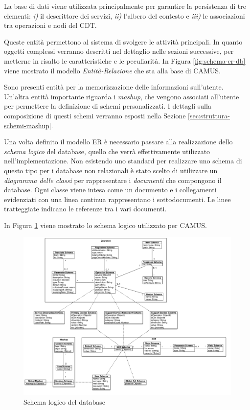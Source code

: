 La base di dati viene utilizzata principalmente per garantire la persistenza di tre elementi: \emph{i)} il descrittore dei servizi, \emph{ii)} l'albero del contesto e \emph{iii)} le associazioni tra operazioni e nodi del CDT.

Queste entità permettono al sistema di svolgere le attività principali. In quanto oggetti complessi verranno descritti nel dettaglio nelle sezioni successive, per metterne in risalto le caratteristiche e le peculiarità. In Figura \ref{fig:schema-er-db} viene mostrato il modello \emph{Entità-Relazione} che sta alla base di CAMUS.

Sono presenti entità per la memorizzazione delle informazioni sull'u\-ten\-te. Un'altra entità importante riguarda i \emph{mashup}, che vengono associati all'utente per permettere la definizione di schemi personalizzati. I dettagli sulla composizione di questi schemi verranno esposti nella Sezione \ref{sec:struttura-schemi-mashup}.

Una volta definito il modello ER è necessario passare alla realizzazione dello \emph{schema logico} del database, quello che verrà effettivamente utilizzato nell'im\-ple\-men\-ta\-zio\-ne. Non esistendo uno standard per realizzare uno schema di questo tipo per i database non relazionali è stato scelto di utilizzare un \emph{diagramma delle classi} per rappresentare i \emph{documenti} che compongono il database. Ogni classe viene intesa come un documento e i collegamenti evidenziati con una linea continua rappresentano i sottodocumenti. Le linee tratteggiate indicano le referenze tra i vari documenti.

In Figura \ref{fig:schema-logico-db} viene mostrato lo schema logico utilizzato per CAMUS.

\begin{figure}[!b]
	\centering
	\includegraphics[width=\textwidth]{5-implementazione-backend/Immagini/schema_logico_db.png}
	\caption{Schema logico del database}\label{fig:schema-logico-db}
\end{figure}

